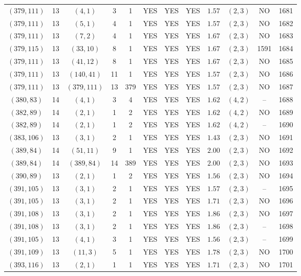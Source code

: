 \begin{longtable}{|c|c|c|c|c|c|c|c|c|c|c|c|}
$(379,111)$ & 13 & $(4,1)$ & 3 & 1 & YES & YES & YES & $1.57$ & $(2,3)$ & NO & 1681\\
$(379,111)$ & 13 & $(5,1)$ & 4 & 1 & YES & YES & YES & $1.57$ & $(2,3)$ & NO & 1682\\
$(379,111)$ & 13 & $(7,2)$ & 4 & 1 & YES & YES & YES & $1.67$ & $(2,3)$ & NO & 1683\\
$(379,115)$ & 13 & $(33,10)$ & 8 & 1 & YES & YES & YES & $1.67$ & $(2,3)$ & 1591 & 1684\\
$(379,111)$ & 13 & $(41,12)$ & 8 & 1 & YES & YES & YES & $1.67$ & $(2,3)$ & NO & 1685\\
$(379,111)$ & 13 & $(140,41)$ & 11 & 1 & YES & YES & YES & $1.57$ & $(2,3)$ & NO & 1686\\
$(379,111)$ & 13 & $(379,111)$ & 13 & 379 & YES & YES & YES & $1.57$ & $(2,3)$ & NO & 1687\\
$(380,83)$ & 14 & $(4,1)$ & 3 & 4 & YES & YES & YES & $1.62$ & $(4,2)$ & -- & 1688\\
$(382,89)$ & 14 & $(2,1)$ & 1 & 2 & YES & YES & YES & $1.62$ & $(4,2)$ & NO & 1689\\
$(382,89)$ & 14 & $(2,1)$ & 1 & 2 & YES & YES & YES & $1.62$ & $(4,2)$ & -- & 1690\\
$(383,106)$ & 13 & $(3,1)$ & 2 & 1 & YES & YES & YES & $1.43$ & $(2,3)$ & NO & 1691\\
$(389,84)$ & 14 & $(51,11)$ & 9 & 1 & YES & YES & YES & $2.00$ & $(2,3)$ & NO & 1692\\
$(389,84)$ & 14 & $(389,84)$ & 14 & 389 & YES & YES & YES & $2.00$ & $(2,3)$ & NO & 1693\\
$(390,89)$ & 13 & $(2,1)$ & 1 & 2 & YES & YES & YES & $1.56$ & $(2,3)$ & NO & 1694\\
$(391,105)$ & 13 & $(3,1)$ & 2 & 1 & YES & YES & YES & $1.57$ & $(2,3)$ & -- & 1695\\
$(391,105)$ & 13 & $(3,1)$ & 2 & 1 & YES & YES & YES & $1.71$ & $(2,3)$ & NO & 1696\\
$(391,108)$ & 13 & $(3,1)$ & 2 & 1 & YES & YES & YES & $1.86$ & $(2,3)$ & NO & 1697\\
$(391,108)$ & 13 & $(3,1)$ & 2 & 1 & YES & YES & YES & $1.86$ & $(2,3)$ & -- & 1698\\
$(391,105)$ & 13 & $(4,1)$ & 3 & 1 & YES & YES & YES & $1.56$ & $(2,3)$ & -- & 1699\\
$(391,109)$ & 13 & $(11,3)$ & 5 & 1 & YES & YES & YES & $1.78$ & $(2,3)$ & NO & 1700\\
$(393,116)$ & 13 & $(2,1)$ & 1 & 1 & YES & YES & YES & $1.71$ & $(2,3)$ & NO & 1701\\

\end{longtable}

